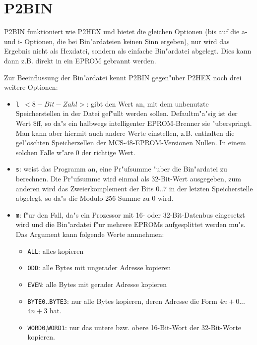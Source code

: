 \documentclass[12pt,a4paper,twoside]{report}
\newcommand{\tty}[1]{{\tt #1}}
\begin{document}
{%

\section{P2BIN}

P2BIN funktioniert wie P2HEX und bietet die gleichen Optionen (bis
auf die a- und i- Optionen, die bei Bin"ardateien keinen Sinn ergeben), nur
wird das Ergebnis nicht als Hexdatei, sondern als einfache Bin"ardatei
abgelegt.  Dies kann dann z.B. direkt in ein EPROM gebrannt werden.
\par
Zur Beeinflussung der Bin"ardatei kennt P2BIN gegen"uber P2HEX noch
drei weitere Optionen:
\begin{itemize}
\item{\tty{l $<8-Bit-Zahl>$}: gibt den Wert an, mit dem unbenutzte
      Speicherstellen in der Datei gef"ullt werden sollen.
      Defaultm"a"sig ist der Wert \$ff, so da"s ein halbwegs
      intelligenter EPROM-Brenner sie "uberspringt.  Man kann aber
      hiermit auch andere Werte einstellen, z.B. enthalten die gel"oschten
      Speicherzellen der MCS-48-EPROM-Versionen Nullen.  In einem solchen
      Falle w"are 0 der richtige Wert.}
\item{\tty{s}: weist das Programm an, eine Pr"ufsumme "uber die Bin"ardatei zu
      berechnen.  Die Pr"ufsumme wird einmal als 32-Bit-Wert ausgegeben,
      zum anderen wird das Zweierkomplement der Bits 0..7 in der letzten
      Speicherstelle abgelegt, so da"s die Modulo-256-Summe zu 0 wird.}
\item{\tty{m}:  f"ur den Fall, da"s ein Prozessor mit 16- oder 32-Bit-Datenbus
      eingesetzt wird und die Bin"ardatei f"ur mehrere EPROMs aufgesplittet
      werden mu"s.  Das Argument kann folgende Werte annnehmen:
      \begin{itemize}
      \item{\tty{ALL}: alles kopieren}
      \item{\tty{ODD}: alle Bytes mit ungerader Adresse kopieren}
      \item{\tty{EVEN}: alle Bytes mit gerader Adresse kopieren}
      \item{\tty{BYTE0}..\tty{BYTE3}: nur alle Bytes kopieren, deren Adresse die Form
            $4n+0$...$4n+3$ hat.}
      \item{\tty{WORD0},\tty{WORD1}: nur das untere bzw. obere 16-Bit-Wort der
            32-Bit-Worte kopieren.}
      \end{itemize}}
\end{itemize}

}
\end{document}
